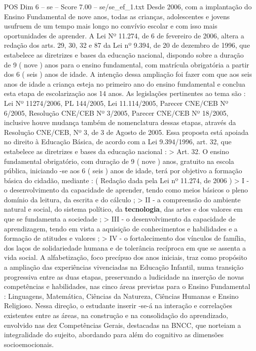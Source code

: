 \begin{textsample}{POS Dim 6 – se – Score 7.00 – se/se\_ef\_1.txt}
Desde 2006, com a implantação do Ensino Fundamental de nove anos, todas as crianças, adolescentes e jovens usufruem de um tempo mais longo no convívio escolar e com isso mais oportunidades de aprender.
A Lei Nº 11.274, de 6 de fevereiro de 2006, altera a redação dos arts. 29, 30, 32 e 87 da Lei nº 9.394, de 20 de dezembro de 1996, que estabelece as diretrizes e bases da educação nacional, dispondo sobre a duração de 9 ( nove ) anos para o ensino fundamental, com matrícula obrigatória a partir dos 6 ( seis ) anos de idade.
A intenção dessa ampliação foi fazer com que aos seis anos de idade a criança esteja no primeiro ano do ensino fundamental e conclua esta etapa de escolarização aos 14 anos.
As legislações pertinentes ao tema são : Lei Nº 11274/2006, PL 144/2005, Lei 11.114/2005, Parecer CNE/CEB Nº 6/2005, Resolução CNE/CEB Nº 3/2005, Parecer CNE/CEB Nº 18/2005, inclusive houve mudança também de nomenclatura dessas etapas, através da Resolução CNE/CEB, Nº 3, de 3 de Agosto de 2005.
Essa proposta está apoiada no direito à Educação Básica, de acordo com a Lei 9.394/1996, art. 32, que estabelece as diretrizes e bases da educação nacional : > Art. 32.
O ensino fundamental obrigatório, com duração de 9 ( nove ) anos, gratuito na escola pública, iniciando -se aos 6 ( seis ) anos de idade, terá por objetivo a formação básica do cidadão, mediante : ( Redação dada pela Lei nº 11.274, de 2006 ) > I - o desenvolvimento da capacidade de aprender, tendo como meios básicos o pleno domínio da leitura, da escrita e do cálculo ; > II - a compreensão do ambiente natural e social, do sistema político, da \textbf{tecnologia}, das artes e dos valores em que se fundamenta a sociedade ; > III - o desenvolvimento da capacidade de aprendizagem, tendo em vista a aquisição de conhecimentos e habilidades e a formação de atitudes e valores ; > IV - o fortalecimento dos vínculos de família, dos laços de solidariedade humana e de tolerância recíproca em que se assenta a vida social.
A alfabetização, foco precípuo dos anos iniciais, traz como propósito a ampliação das experiências vivenciadas na Educação Infantil, numa transição progressiva entre as duas etapas, preservando a ludicidade na inserção de novas competências e habilidades, nas cinco áreas previstas para o Ensino Fundamental : Linguagens, Matemática, Ciências da Natureza, Ciências Humanas e Ensino Religioso.
Nessa direção, o estudante inserir -se-á na interação e correlações existentes entre as áreas, na construção e na consolidação do aprendizado, envolvido nas dez Competências Gerais, destacadas na BNCC, que norteiam a integralidade do sujeito, abordando para além do cognitivo as dimensões socioemocionais.

\end{textsample}
